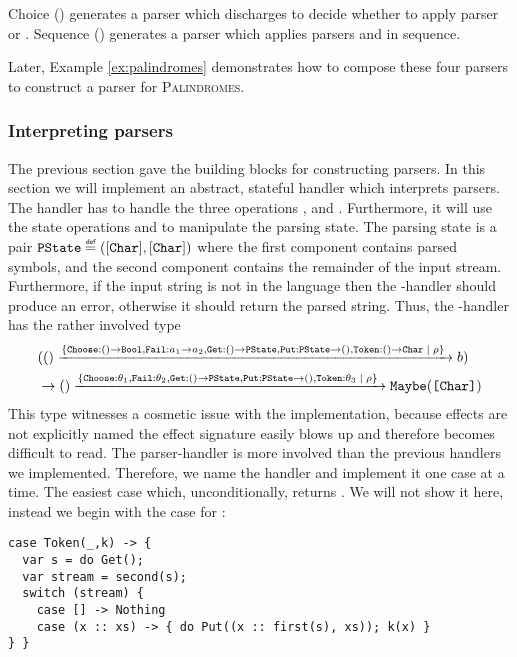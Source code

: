 Choice (\code{<|>}) generates a parser which discharges  to decide whether to apply parser  or . Sequence (\code{<*>}) generates a parser which applies parsers  and  in sequence.

Later, Example \ref{ex:palindromes} demonstrates how to compose these four parsers to construct a parser for {\scshape{Palindromes}}.

\subsubsection{Interpreting parsers}
The previous section gave the building blocks for constructing parsers. In this section we will implement an abstract, stateful handler which interprets parsers. The handler has to handle the three operations ,  and . Furthermore, it will use the state operations  and  to manipulate the parsing state. The parsing state is a pair $\type{PState} \defas ([\type{Char}],[\type{Char}])$ where the first component contains parsed symbols, and the second component contains the remainder of the input stream. Furthermore, if the input string is not in the language then the -handler should produce an error, otherwise it should return the parsed string. Thus, the -handler has the rather involved type
\begin{align*}
&(() \xrightarrow{\{\texttt{Choose}: () \to \texttt{Bool},\texttt{Fail}: a_1 \to a_2,\texttt{Get}: () \to \texttt{PState},\texttt{Put}: \texttt{PState} \to (), \texttt{Token}: () \to \texttt{Char} \; | \; \rho\}\;} b)\\
&\to () \xrightarrow{\{\texttt{Choose}: \theta_1,\texttt{Fail}: \theta_2,\texttt{Get}: () \to \texttt{PState},\texttt{Put}: \texttt{PState} \to (), \texttt{Token}: \theta_3 \; | \; \rho\}\;} \texttt{Maybe}(\texttt{[Char]})
\end{align*}
This type witnesses a cosmetic issue with the implementation, because effects are not explicitly named the effect signature easily blows up and therefore becomes difficult to read. The parser-handler is more involved than the previous handlers we implemented. Therefore, we name the handler  and implement it one case at a time. The easiest case  which, unconditionally, returns . We will not show it here, instead we begin with the case for :
\begin{lstlisting}[style=links]
case Token(_,k) -> {
  var s = do Get();
  var stream = second(s);
  switch (stream) {
    case [] -> Nothing
    case (x :: xs) -> { do Put((x :: first(s), xs)); k(x) }
} }
\end{lstlisting}
